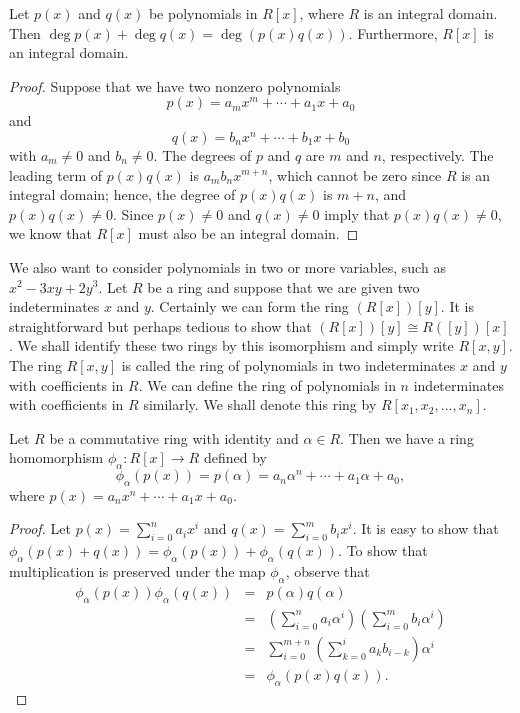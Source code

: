 \begin{proposition}\label{poly_theorem_2}
Let $p(x)$ and $q(x)$ be polynomials in $R[x]$, where $R$ is an integral domain.  Then $\deg p(x) + \deg q(x) = \deg( p(x) q(x) )$.  Furthermore, $R[x]$ is an integral domain.
\end{proposition}

\begin{proof}
Suppose that we have two nonzero polynomials 
$$
p(x) = a_m x^m + \cdots + a_1 x + a_0
$$
and 
$$
q(x) = b_n x^n + \cdots + b_1 x + b_0
$$
with $a_m \neq 0$ and $b_n \neq 0$. The degrees of $p$ and $q$ are $m$ and $n$, respectively.  The leading term of $p(x) q(x)$ is $a_m b_n x^{m + n}$, which cannot be zero since $R$ is an integral domain; hence, the degree of $p(x) q(x)$ is $m + n$, and $p(x)q(x) \neq 0$.  Since $p(x) \neq 0$ and $q(x) \neq 0$ imply that $p(x)q(x) \neq 0$, we know that $R[x]$ must also be an integral domain.
\end{proof}

\medskip

We also want to consider polynomials in two or more variables, such as $x^2 - 3 x y + 2 y^3$.  Let $R$ be a ring and suppose that we are given two indeterminates $x$ and $y$.  Certainly we can form the ring $(R[x])[y]$.  It is straightforward but perhaps tedious to show that $(R[x])[y] \cong R([y])[x]$.  We shall identify these two rings by this isomorphism and simply write $R[x,y]$.  The ring $R[x, y]$ is called the {\bfi ring of polynomials in two indeterminates $x$ and $y$ with coefficients in} $R$.  We can define the {\bfi ring of polynomials in} $n$ {\bfi indeterminates with coefficients in} $R$ similarly.  We shall denote this ring by $R[x_1, x_2, \ldots, x_n]$\label{notepolynvar}.  

\begin{theorem}\label{poly_theorem_3}
Let $R$ be a commutative ring with identity and $\alpha \in R$.  Then we have a ring homomorphism  $\phi_{\alpha} : R[x] \rightarrow R$\label{noteevalhomo} defined by  
$$
\phi_{\alpha} (p(x) ) = p( \alpha ) = a_n \alpha^n + \cdots + a_1 \alpha + a_0,
$$
where $p( x ) = a_n x^n + \cdots + a_1 x + a_0$.
\end{theorem}

\begin{proof}
Let $p(x) = \sum_{i = 0}^n a_i x^i$ and $q(x) = \sum_{i = 0}^m b_i x^i$.  It is easy to show that $\phi_{\alpha}(p(x) + q(x)) = \phi_{\alpha}(p(x))  + \phi_{\alpha}(q(x))$.  To show that multiplication is preserved under the map $\phi_{\alpha}$, observe that
\begin{eqnarray*}
\phi_{\alpha} (p(x) ) \phi_{\alpha} (q(x) ) 
& = & 
p( \alpha ) q(\alpha) \\
& = & 
\left(
\sum_{i = 0}^n a_i \alpha^i
\right)
\left(
\sum_{i=0}^m b_i \alpha^i
\right) \\
& = & 
\sum_{i=0}^{m+n} 
\left(
\sum_{k=0}^i a_k b_{i-k}
\right)  \alpha^i \\
& = &
\phi_{\alpha} (p(x) q(x) ). 
\end{eqnarray*}
\end{proof}

